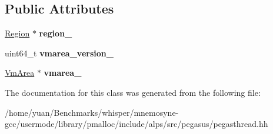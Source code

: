 \subsection*{Public Attributes}
\begin{DoxyCompactItemize}
\item 
\hyperlink{classalps_1_1Region}{Region} $\ast$ {\bfseries region\+\_\+}\hypertarget{classalps_1_1PegasThread_aa6495df538b6beb29f6515321572b07f}{}\label{classalps_1_1PegasThread_aa6495df538b6beb29f6515321572b07f}

\item 
uint64\+\_\+t {\bfseries vmarea\+\_\+version\+\_\+}\hypertarget{classalps_1_1PegasThread_a01a36ffdbda7b3e97fdf801bfa618052}{}\label{classalps_1_1PegasThread_a01a36ffdbda7b3e97fdf801bfa618052}

\item 
\hyperlink{classalps_1_1VmArea}{Vm\+Area} $\ast$ {\bfseries vmarea\+\_\+}\hypertarget{classalps_1_1PegasThread_a0d3aca0aaafe8c9094ee5175ec23467d}{}\label{classalps_1_1PegasThread_a0d3aca0aaafe8c9094ee5175ec23467d}

\end{DoxyCompactItemize}


The documentation for this class was generated from the following file\+:\begin{DoxyCompactItemize}
\item 
/home/yuan/\+Benchmarks/whisper/mnemosyne-\/gcc/usermode/library/pmalloc/include/alps/src/pegasus/pegasthread.\+hh\end{DoxyCompactItemize}
